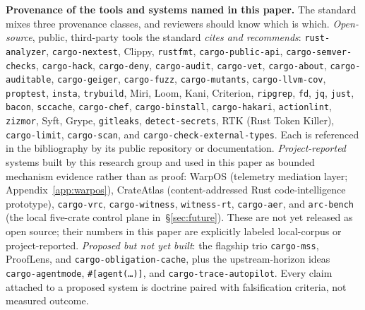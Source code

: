 \documentclass[conference]{IEEEtran}
\begin{document}
\noindent\textbf{Provenance of the tools and systems named in this paper.} The standard mixes three provenance classes, and reviewers should know which is which. \emph{Open-source}, public, third-party tools the standard \emph{cites and recommends}: \texttt{rust-analyzer}, \texttt{cargo-nextest}, Clippy, \texttt{rustfmt}, \texttt{cargo-public-api}, \texttt{cargo-semver-checks}, \texttt{cargo-hack}, \texttt{cargo-deny}, \texttt{cargo-audit}, \texttt{cargo-vet}, \texttt{cargo-about}, \texttt{cargo-auditable}, \texttt{cargo-geiger}, \texttt{cargo-fuzz}, \texttt{cargo-mutants}, \texttt{cargo-llvm-cov}, \texttt{proptest}, \texttt{insta}, \texttt{trybuild}, Miri, Loom, Kani, Criterion, \texttt{ripgrep}, \texttt{fd}, \texttt{jq}, \texttt{just}, \texttt{bacon}, \texttt{sccache}, \texttt{cargo-chef}, \texttt{cargo-binstall}, \texttt{cargo-hakari}, \texttt{actionlint}, \texttt{zizmor}, Syft, Grype, \texttt{gitleaks}, \texttt{detect-secrets}, RTK (Rust Token Killer), \texttt{cargo-limit}, \texttt{cargo-scan}, and \texttt{cargo-check-external-types}. Each is referenced in the bibliography by its public repository or documentation. \emph{Project-reported} systems built by this research group and used in this paper as bounded mechanism evidence rather than as proof: WarpOS (telemetry mediation layer; Appendix~\ref{app:warpos}), CrateAtlas (content-addressed Rust code-intelligence prototype), \texttt{cargo-vrc}, \texttt{cargo-witness}, \texttt{witness-rt}, \texttt{cargo-aer}, and \texttt{arc-bench} (the local five-crate control plane in~\S\ref{sec:future}). These are not yet released as open source; their numbers in this paper are explicitly labeled local-corpus or project-reported. \emph{Proposed but not yet built}: the flagship trio \texttt{cargo-mss}, ProofLens, and \texttt{cargo-obligation-cache}, plus the upstream-horizon ideas \texttt{cargo-agentmode}, \texttt{\#[agent(\ldots)]}, and \texttt{cargo-trace-autopilot}. Every claim attached to a proposed system is doctrine paired with falsification criteria, not measured outcome.
\end{document}
